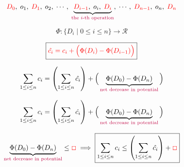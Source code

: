 
\begin{frame}{}
  \[
    \textcolor{red}{D_0},\; o_1,\; \textcolor{red}{D_1},\; o_2,\; \cdots,\; \underbrace{\textcolor{red}{D_{i-1}},\; o_{i},\; \textcolor{red}{D_{i}}}_{\text{\textcolor{purple}{the $i$-th operation}}},\; 
    \cdots,\; \textcolor{red}{D_{n-1}},\; o_{n},\; \textcolor{red}{D_{n}}
  \]

  \pause
  \vspace{0.50cm}
  \[
    \Phi: \Big\{D_{i} \mid 0 \le i \le n\Big\} \to \mathcal{R}
  \]

  \pause
  \vspace{0.30cm}
  \[
    \boxed{\textcolor{red}{\hat{c_i} = c_i + \Big(\Phi(D_{i}) - \Phi(D_{i-1})\Big)}}
  \]

  \pause
  \vspace{0.50cm}
  \[
    \sum_{1 \le i \le n} c_i = \left( \sum_{1 \le i \le n} \hat{c_i} \right) 
      + \Big(\underbrace{\Phi(D_{0}) - \Phi(D_{n})}_{\text{\textcolor{purple}{net decrease in potential}}} \Big)
  \]
\end{frame}

\begin{frame}{}
  \[
    \sum_{1 \le i \le n} c_i = \left( \sum_{1 \le i \le n} \hat{c_i} \right) 
      + \Big(\underbrace{\Phi(D_{0}) - \Phi(D_{n})}_{\text{\textcolor{purple}{net decrease in potential}}} \Big)
  \]

  \pause
  \vspace{0.80cm}
  \[
    \underbrace{\Phi(D_{0}) - \Phi(D_{n})}_{\text{\textcolor{purple}{net decrease in potential}}} \le \textcolor{red}{\Box}
    \implies
    \boxed{\sum_{1 \le i \le n} c_i \le \left( \sum_{1 \le i \le n} \hat{c_i} \right) + \textcolor{red}{\Box}}
  \]
\end{frame}

% 
% 
% 
